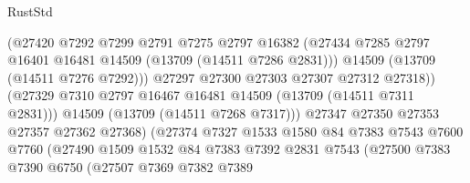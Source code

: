 \begin{lexlean}{RustStd}
\begin{coremodule}
                                    (@27420
                                      @7292
                                      @7299
                                      @2791
                                      @7275
                                      @2797
                                      @16382
                                      (@27434
                                        @7285
                                        @2797
                                        @16401
                                        @16481
                                        @14509
                                        (@13709 (@14511 @7286 @2831)))
                                      @14509
                                      (@13709 (@14511 @7276 @7292)))
                                    @27297
                                    @27300
                                    @27303
                                    @27307
                                    @27312
                                    @27318))
                                (@27329
                                  @7310
                                  @2797
                                  @16467
                                  @16481
                                  @14509
                                  (@13709 (@14511 @7311 @2831)))
                                @14509
                                (@13709 (@14511 @7268 @7317)))
                              @27347
                              @27350
                              @27353
                              @27357
                              @27362
                              @27368)
                            (@27374
                              @7327
                              @1533
                              @1580
                              @84
                              @7383
                              @7543
                              @7600
                              @7760
                              (@27490
                                @1509
                                @1532
                                @84
                                @7383
                                @7392
                                @2831
                                @7543
                                (@27500
                                  @7383
                                  @7390
                                  @6750
                                  (@27507
                                    @7369
                                    @7382
                                    @7389

\end{coremodule}
\end{lexlean}
